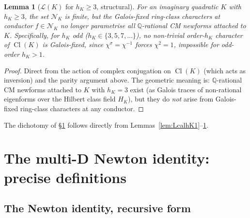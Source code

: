 \documentclass[11pt,a4paper]{amsart}
\newtheorem{lemma}[theorem]{Lemma}
\theoremstyle{definition}
\DeclareMathOperator{\Cl}{Cl}
\newcommand{\Q}{\mathbb{Q}}
\newcommand{\Lcal}{\mathcal{L}}
\newcommand{\Ncal}{\mathcal{N}}
\newcommand{\hK}{h_{K}}
\begin{document}
\begin{lemma}[$\Lcal(K)$ for $\hK \ge 3$, structural]\label{lem:LcalhK3}
For an imaginary quadratic $K$ with $\hK \ge 3$, the set $\Ncal_K$ is finite, but the Galois-fixed ring-class characters at conductor $f \in \Ncal_K$ no longer parametrise all $\Q$-rational CM newforms attached to $K$. Specifically, for $\hK$ odd ($\hK \in \{3, 5, 7, \ldots\}$), no non-trivial order-$\hK$ character of $\Cl(K)$ is Galois-fixed, since $\chi^\sigma = \chi^{-1}$ forces $\chi^2 = 1$, impossible for odd-order $\hK > 1$.
\end{lemma}

\begin{proof}
Direct from the action of complex conjugation on $\Cl(K)$ (which acts as inversion) and the parity argument above. The geometric meaning is: $\Q$-rational CM newforms attached to $K$ with $\hK = 3$ exist (as Galois traces of non-rational eigenforms over the Hilbert class field $H_K$), but they do \emph{not} arise from Galois-fixed ring-class characters at any conductor.
\end{proof}

The dichotomy of \S\ref{sec:newton-defn} follows directly from Lemmas~\ref{lem:LcalhK1}--\ref{lem:LcalhK3}.


\section{The multi-D Newton identity: precise definitions}\label{sec:newton-defn}

\subsection{The Newton identity, recursive form}\label{sec:newton-recursive}
\end{document}
